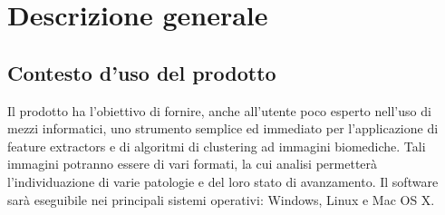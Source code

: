 \section{Descrizione generale}
\label{descgen}
\subsection{Contesto d'uso del prodotto}
Il prodotto ha l'obiettivo di fornire, anche all'utente poco esperto nell'uso di mezzi informatici, uno strumento semplice ed immediato per l'applicazione di feature extractors\glossario{} e di algoritmi di clustering\glossario{} ad immagini biomediche. Tali immagini potranno essere di vari formati, la cui analisi permetterà l'individuazione di varie patologie e del loro stato di avanzamento. Il software sarà eseguibile nei principali sistemi operativi: Windows\glossario{}, Linux\glossario{} e Mac OS\glossario{} X.

